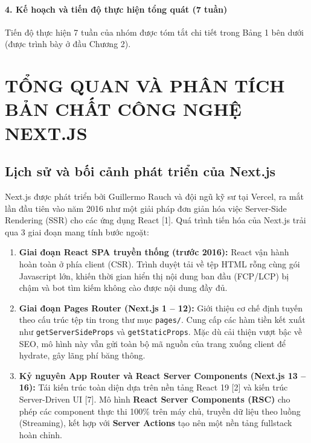 \documentclass[13pt,a4paper]{extarticle}
\begin{document}
\paragraph*{4. Kế hoạch và tiến độ thực hiện tổng quát (7 tuần)}
Tiến độ thực hiện 7 tuần của nhóm được tóm tắt chi tiết trong Bảng 1 bên dưới (được trình bày ở đầu Chương 2).

\newpage
{}

\section{TỔNG QUAN VÀ PHÂN TÍCH BẢN CHẤT CÔNG NGHỆ NEXT.JS}

\subsection{Lịch sử và bối cảnh phát triển của Next.js}
Next.js được phát triển bởi Guillermo Rauch và đội ngũ kỹ sư tại Vercel, ra mắt lần đầu tiên vào năm 2016 như một giải pháp đơn giản hóa việc Server-Side Rendering (SSR) cho các ứng dụng React [1]. Quá trình tiến hóa của Next.js trải qua 3 giai đoạn mang tính bước ngoặt:
\begin{enumerate}[noitemsep]
    \item \textbf{Giai đoạn React SPA truyền thống (trước 2016):} React vận hành hoàn toàn ở phía client (CSR). Trình duyệt tải về tệp HTML rỗng cùng gói Javascript lớn, khiến thời gian hiển thị nội dung ban đầu (FCP/LCP) bị chậm và bot tìm kiếm không cào được nội dung đầy đủ.
    \item \textbf{Giai đoạn Pages Router (Next.js 1 -- 12):} Giới thiệu cơ chế định tuyến theo cấu trúc tệp tin trong thư mục \texttt{pages/}. Cung cấp các hàm tiền kết xuất như \texttt{getServerSideProps} và \texttt{getStaticProps}. Mặc dù cải thiện vượt bậc về SEO, mô hình này vẫn gửi toàn bộ mã nguồn của trang xuống client để hydrate, gây lãng phí băng thông.
    \item \textbf{Kỷ nguyên App Router và React Server Components (Next.js 13 -- 16):} Tái kiến trúc toàn diện dựa trên nền tảng React 19 [2] và kiến trúc Server-Driven UI [7]. Mô hình \textbf{React Server Components (RSC)} cho phép các component thực thi 100\% trên máy chủ, truyền dữ liệu theo luồng (Streaming), kết hợp với \textbf{Server Actions} tạo nên một nền tảng fullstack hoàn chỉnh.
\end{enumerate}
\end{document}
